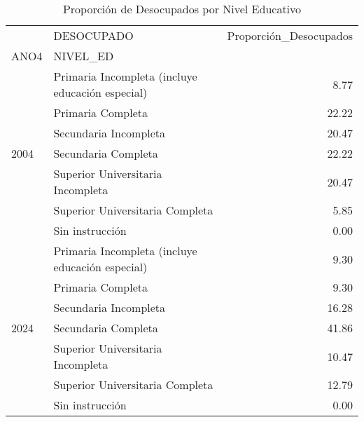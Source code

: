 \begin{table}
\caption{Proporción de Desocupados por Nivel Educativo}
\label{tab:proporcion_desocupados}
\begin{tabular}{llr}
\toprule
 & DESOCUPADO & Proporción_Desocupados \\
ANO4 & NIVEL_ED &  \\
\midrule
\multirow[t]{7}{*}{2004} & Primaria Incompleta (incluye educación especial) & 8.77 \\
 & Primaria Completa & 22.22 \\
 & Secundaria Incompleta & 20.47 \\
 & Secundaria Completa & 22.22 \\
 & Superior Universitaria Incompleta & 20.47 \\
 & Superior Universitaria Completa & 5.85 \\
 & Sin instrucción & 0.00 \\
\cline{1-3}
\multirow[t]{7}{*}{2024} & Primaria Incompleta (incluye educación especial) & 9.30 \\
 & Primaria Completa & 9.30 \\
 & Secundaria Incompleta & 16.28 \\
 & Secundaria Completa & 41.86 \\
 & Superior Universitaria Incompleta & 10.47 \\
 & Superior Universitaria Completa & 12.79 \\
 & Sin instrucción & 0.00 \\
\cline{1-3}
\bottomrule
\end{tabular}
\end{table}
